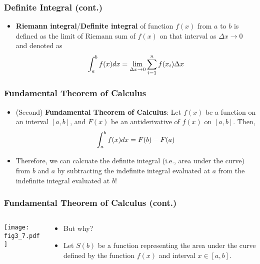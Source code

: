 \documentclass[pdflatex, 12pt]{beamer}
\begin{document}
\begin{frame}
\frametitle{Definite Integral (cont.)}
\begin{itemize}
\item \textbf{Riemann integral}/\textbf{Definite integral} of function $f(x)$ from $a$ to $b$ is defined as the limit of Riemann sum of $f(x)$ on that interval as $\Delta x \to 0$ and denoted as 
 \begin{equation}
 \int^b_a f(x)dx = \lim_{\Delta x \to 0} \sum_{i = 1}^{n} f(x_i) \Delta x \notag
 \end{equation}
\end{itemize}
\end{frame}

\begin{frame}
\frametitle{Fundamental Theorem of Calculus}
\begin{itemize}
\item (Second) \textbf{Fundamental Theorem of Calculus}: Let $f(x)$ be a function on an interval $[a, b]$, and $F(x)$ be an antiderivative of $f(x)$ on $[a, b]$. Then,
 \begin{equation}
 \int^b_a f(x)dx = F(b) - F(a) \notag
 \end{equation}
\item Therefore, we can calcuate the definite integral (i.e., area under the curve) from $b$ and $a$ by subtracting the indefinite integral evaluated at $a$ from the indefinite integral evaluated at $b$! 
\end{itemize}
\end{frame}

\begin{frame}
\frametitle{Fundamental Theorem of Calculus (cont.)}
\begin{columns}
\begin{column}{0.5\textwidth}
\texttt{[image: fig3\_7.pdf]}
\end{column}
\begin{column}{0.5\textwidth}
\begin{itemize}
\item But why?
\vspace{0.4cm}
\item Let $S(b)$ be a function representing the area under the curve defined by the function $f(x)$ and interval $x \in [a, b]$.
\end{itemize}
\end{column}
\end{columns}
\end{frame}
\end{document}
